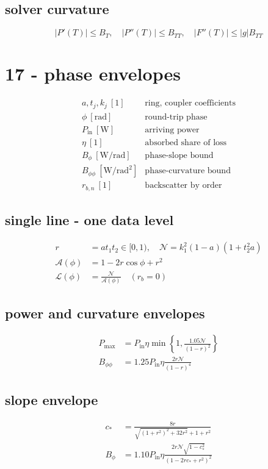 \subsection*{solver curvature}
\[
\displaystyle |P'(T)|\le B_T,\quad|P''(T)|\le B_{TT},\quad|F''(T)|\le |g|B_{TT}
\]

\clearpage
\section*{17 - phase envelopes}

\[
\begin{array}{ll}a,t_j,k_j\ [1]&\text{ring, coupler coefficients}\\[0.6em]\phi\ [\mathrm{rad}]&\text{round-trip phase}\\[0.6em]P_{\mathrm{in}}\ [\mathrm W]&\text{arriving power}\\[0.6em]\eta\ [1]&\text{absorbed share of loss}\\[0.6em]B_\phi\ [\mathrm{W/rad}]&\text{phase-slope bound}\\[0.6em]B_{\phi\phi}\ [\mathrm{W/rad^2}]&\text{phase-curvature bound}\\[0.6em]r_{b,n}\ [1]&\text{backscatter by order}\end{array}
\]

\subsection*{single line - one data level}
\[
\displaystyle \begin{aligned}r&=at_1t_2\in[0,1),\quad\mathcal N=k_1^2(1-a)(1+t_2^2a)\\\mathcal A(\phi)&=1-2r\cos\phi+r^2\\\mathcal L(\phi)&=\frac{\mathcal N}{\mathcal A(\phi)}\quad(r_b=0)\end{aligned}
\]

\subsection*{power and curvature envelopes}
\[
\displaystyle \begin{aligned}P_{\max}&=P_{\mathrm{in}}\eta\min\!\left\{1,\frac{1.05\mathcal N}{(1-r)^2}\right\}\\B_{\phi\phi}&=1.25P_{\mathrm{in}}\eta\frac{2r\mathcal N}{(1-r)^4}\end{aligned}
\]

\subsection*{slope envelope}
\[
\displaystyle \begin{aligned}c_*&=\frac{8r}{\sqrt{(1+r^2)^2+32r^2}+1+r^2}\\B_\phi&=1.10P_{\mathrm{in}}\eta\frac{2r\mathcal N\sqrt{1-c_*^2}}{(1-2rc_*+r^2)^2}\end{aligned}
\]


